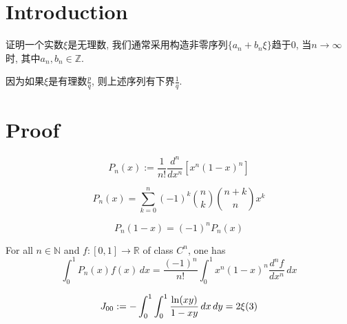%

\chapter{Introduction}

证明一个实数$\xi$是无理数, 我们通常采用构造非零序列$\{a_n + b_n\xi\}$趋于$0$, 当$n \rightarrow \infty$时, 其中$a_n, b_n \in \mathbb{Z}$.

因为如果$\xi$是有理数$\frac{p}{q}$, 则上述序列有下界$\frac{1}{q}$.

\chapter{Proof}

\begin{definition}\label{Legendre_poly}
    \[ P_n(x):=\frac{1}{n!}\frac{d^n}{dx^n}[x^n(1-x)^n] \]
\end{definition}

\begin{lemma}\label{Legendre_poly_is_int}
    \[ P_n(x)=\sum\limits_{k=0}^{n}(-1)^k\binom{n}{k}\binom{n+k}{n}x^k \]
\end{lemma}

\begin{lemma}\label{Legendre_poly_sym}
    \[ P_n(1-x)=(-1)^nP_n(x) \]
\end{lemma}

\begin{lemma}\label{Legendre_poly_integral}
    For all $n \in \mathbb{N}$ and $f : [0,1] \rightarrow \mathbb{R}$ of class $C^n$, one has
    \[ \int_{0}^{1}P_n(x)f(x) \, dx =\frac{(-1)^n}{n!} \int_{0}^{1} x^n(1-x)^n\frac{d^nf}{dx^n} \, dx \]
\end{lemma}

\begin{lemma}\label{integral_zeta_3}
    \[ J_{00} := -\int_{0}^{1}\int_{0}^{1} \frac{{\rm ln}(xy)}{1-xy} \, dx \, dy = 2\xi(3) \]
\end{lemma}

